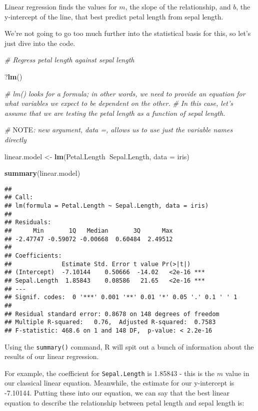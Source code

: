 \documentclass[]{article}
\newenvironment{Shaded}{\begin{snugshade}}{\end{snugshade}}
\newcommand{\KeywordTok}[1]{\textcolor[rgb]{0.13,0.29,0.53}{\textbf{#1}}}
\newcommand{\DataTypeTok}[1]{\textcolor[rgb]{0.13,0.29,0.53}{#1}}
\newcommand{\StringTok}[1]{\textcolor[rgb]{0.31,0.60,0.02}{#1}}
\newcommand{\CommentTok}[1]{\textcolor[rgb]{0.56,0.35,0.01}{\textit{#1}}}
\newcommand{\OperatorTok}[1]{\textcolor[rgb]{0.81,0.36,0.00}{\textbf{#1}}}
\newcommand{\AlertTok}[1]{\textcolor[rgb]{0.94,0.16,0.16}{#1}}
\newcommand{\NormalTok}[1]{#1}
\begin{document}
Linear regression finds the values for \(m\), the slope of the
relationship, and \(b\), the y-intercept of the line, that best predict
petal length from sepal length.

We're not going to go too much further into the statistical basis for
this, so let's just dive into the code.

\begin{Shaded}
\begin{Highlighting}[]
\CommentTok{# Regress petal length against sepal length}

\NormalTok{?}\KeywordTok{lm}\NormalTok{()}

\CommentTok{# lm() looks for a formula; in other words, we need to provide an equation for what variables we expect to be dependent on the other. }
\CommentTok{# In this case, let's assume that we are testing the petal length as a function of sepal length. }

\CommentTok{# }\AlertTok{NOTE}\CommentTok{: new argument, data =, allows us to use just the variable names directly}

\NormalTok{linear.model <-}\StringTok{ }\KeywordTok{lm}\NormalTok{(Petal.Length}\OperatorTok{~}\NormalTok{Sepal.Length,}
   \DataTypeTok{data =}\NormalTok{ iris)}

\KeywordTok{summary}\NormalTok{(linear.model)}
\end{Highlighting}
\end{Shaded}

\begin{verbatim}
## 
## Call:
## lm(formula = Petal.Length ~ Sepal.Length, data = iris)
## 
## Residuals:
##      Min       1Q   Median       3Q      Max 
## -2.47747 -0.59072 -0.00668  0.60484  2.49512 
## 
## Coefficients:
##              Estimate Std. Error t value Pr(>|t|)    
## (Intercept)  -7.10144    0.50666  -14.02   <2e-16 ***
## Sepal.Length  1.85843    0.08586   21.65   <2e-16 ***
## ---
## Signif. codes:  0 '***' 0.001 '**' 0.01 '*' 0.05 '.' 0.1 ' ' 1
## 
## Residual standard error: 0.8678 on 148 degrees of freedom
## Multiple R-squared:   0.76,  Adjusted R-squared:  0.7583 
## F-statistic: 468.6 on 1 and 148 DF,  p-value: < 2.2e-16
\end{verbatim}

Using the \texttt{summary()} command, R will spit out a bunch of
information about the results of our linear regression.

For example, the coefficient for \texttt{Sepal.Length} is 1.85843 - this
is the \(m\) value in our classical linear equation. Meanwhile, the
estimate for our y-intercept is -7.10144. Putting these into our
equation, we can say that the best linear equation to describe the
relationship between petal length and sepal length is:
\end{document}
